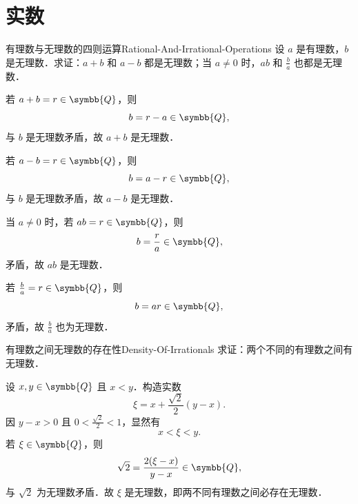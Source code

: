 \section{实数}

\begin{problem}{有理数与无理数的四则运算}{Rational-And-Irrational-Operations}
    设 $a$ 是有理数，$b$ 是无理数．求证：$a + b$ 和 $a - b$ 都是无理数；当 $a \neq 0$ 时，$ab$ 和 $\frac{b}{a}$ 也都是无理数．
\end{problem}

\begin{myproof}
    若 $a + b = r \in \symbb{Q}$，则
    \begin{equation}
        b = r - a \in \symbb{Q},
    \end{equation}
    与 $b$ 是无理数矛盾，故 $a + b$ 是无理数．

    若 $a - b = r \in \symbb{Q}$，则
    \begin{equation}
        b = a - r \in \symbb{Q},
    \end{equation}
    与 $b$ 是无理数矛盾，故 $a - b$ 是无理数．

    当 $a \neq 0$ 时，若 $ab = r \in \symbb{Q}$，则
    \begin{equation}
        b = \frac{r}{a} \in \symbb{Q},
    \end{equation}
    矛盾，故 $ab$ 是无理数．

    若 $\frac{b}{a} = r \in \symbb{Q}$，则
    \begin{equation}
        b = a r \in \symbb{Q},
    \end{equation}
    矛盾，故 $\frac{b}{a}$ 也为无理数．
\end{myproof}

\begin{problem}{有理数之间无理数的存在性}{Density-Of-Irrationals}
    求证：两个不同的有理数之间有无理数．
\end{problem}

\begin{myproof}
    设 $x, y \in \symbb{Q}$ 且 $x < y$．构造实数
    \begin{equation}
        \xi = x + \frac{\sqrt{2}}{2}(y - x).
    \end{equation}
    因 $y - x > 0$ 且 $0 < \frac{\sqrt{2}}{2} < 1$，显然有
    \begin{equation}
        x < \xi < y.
    \end{equation}
    若 $\xi \in \symbb{Q}$，则
    \begin{equation}
        \sqrt{2} = \frac{2(\xi - x)}{y - x} \in \symbb{Q},
    \end{equation}
    与 $\sqrt{2}$ 为无理数矛盾．故 $\xi$ 是无理数，即两不同有理数之间必存在无理数．
\end{myproof}

